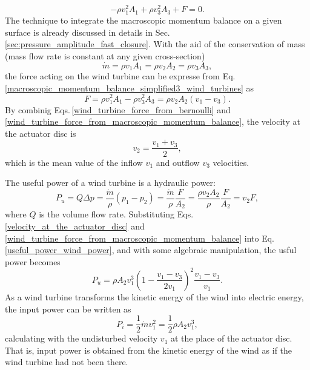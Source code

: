 %
\begin{equation} \label{macroscopic_momentum_balance_simplified3_wind_turbines}
-\rho v_1^2 A_1 + \rho v_3^2 A_3 + F = 0.
\end{equation}
%
The technique to integrate the macroscopic momentum balance on a given surface is already discussed in details in Sec.\,\ref{sec:pressure_amplitude_fast_closure}. With the aid of the conservation of mass (mass flow rate is constant at any given cross-section)
%
\begin{equation} \label{conservation_of_mass_wind_turbines}
\dot{m} = \rho v_1 A_1 = \rho v_2 A_2 = \rho v_3 A_3,
\end{equation}
%
the force acting on the wind turbine can be expresse from Eq.\,\ref{macroscopic_momentum_balance_simplified3_wind_turbines} as
%
\begin{equation} \label{wind_turbine_force_from_macroscopic_momentum_balance}
F = \rho v_1^2 A_1 - \rho v_3^2 A_3 = \rho v_2 A_2 (v_1 - v_3).
\end{equation}
%
By combinig Eqs.\,\eqref{wind_turbine_force_from_bernoulli} and \eqref{wind_turbine_force_from_macroscopic_momentum_balance}, the velocity at the actuator disc is
%
\begin{equation} \label{velocity_at_the_actuator_disc}
v_2 = \frac{v_1+v_3}{2},
\end{equation}
%
which is the mean value of the inflow $v_1$ and outflow $v_3$ velocities.

The useful power of a wind turbine is a hydraulic power:
%
\begin{equation} \label{useful_power_wind_power}
P_u = Q \Delta p = \frac{\dot{m}}{\rho} (p_1-p_2) = \frac{\dot{m}}{\rho} \frac{F}{A_2} = \frac{\rho v_2 A_2}{\rho} \frac{F}{A_2} = v_2 F,
\end{equation}
%
where $Q$ is the volume flow rate. Substituting Eqs.\,\eqref{velocity_at_the_actuator_disc} and \eqref{wind_turbine_force_from_macroscopic_momentum_balance} into Eq.\,\eqref{useful_power_wind_power}, and with some algebraic manipulation, the usful power becomes
%
\begin{equation} \label{useful_power_final}
P_u = \rho A_2 v_1^3 \left( 1 - \frac{v_1-v_3}{2 v_1} \right)^2 \frac{v_1-v_3}{v_1}.
\end{equation}
%
As a wind turbine transforms the kinetic energy of the wind into electric energy, the input power can be written as
%
\begin{equation} \label{input_power_wind_power}
P_i = \frac{1}{2} \dot{m} v_1^2 = \frac{1}{2} \rho A_2 v_1^3,
\end{equation}
%
calculating with the undisturbed velocity $v_1$ at the place of the actuator disc. That is, input power is obtained from the kinetic energy of the wind as if the wind turbine had not been there.

